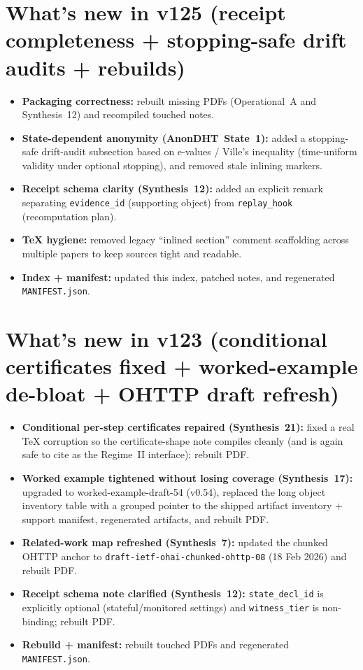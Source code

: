 \documentclass[11pt]{article}
\begin{document}
\section{What's new in v125 (receipt completeness + stopping-safe drift audits + rebuilds)}
\begin{itemize}[leftmargin=*]
\item \textbf{Packaging correctness:} rebuilt missing PDFs (Operational~A and Synthesis~12) and recompiled touched notes.
\item \textbf{State-dependent anonymity (AnonDHT~State~1):} added a stopping-safe drift-audit subsection based on e-values / Ville's inequality (time-uniform validity under optional stopping), and removed stale inlining markers.
\item \textbf{Receipt schema clarity (Synthesis~12):} added an explicit remark separating \texttt{evidence\_id} (supporting object) from \texttt{replay\_hook} (recomputation plan).
\item \textbf{TeX hygiene:} removed legacy ``inlined section'' comment scaffolding across multiple papers to keep sources tight and readable.
\item \textbf{Index + manifest:} updated this index, patched notes, and regenerated \texttt{MANIFEST.json}.
\end{itemize}

\section{What's new in v123 (conditional certificates fixed + worked-example de-bloat + OHTTP draft refresh)}
\begin{itemize}[leftmargin=*]
\item \textbf{Conditional per-step certificates repaired (Synthesis~21):} fixed a real TeX corruption so the certificate-shape note compiles cleanly (and is again safe to cite as the Regime~II interface); rebuilt PDF.
\item \textbf{Worked example tightened without losing coverage (Synthesis~17):} upgraded to worked-example-draft-54 (v0.54), replaced the long object inventory table with a grouped pointer to the shipped artifact inventory + support manifest, regenerated artifacts, and rebuilt PDF.
\item \textbf{Related-work map refreshed (Synthesis~7):} updated the chunked OHTTP anchor to \texttt{draft-ietf-ohai-chunked-ohttp-08} (18 Feb 2026) and rebuilt PDF.
\item \textbf{Receipt schema note clarified (Synthesis~12):} \texttt{state\_decl\_id} is explicitly optional (stateful/monitored settings) and \texttt{witness\_tier} is non-binding; rebuilt PDF.
\item \textbf{Rebuild + manifest:} rebuilt touched PDFs and regenerated \texttt{MANIFEST.json}.
\end{itemize}
\end{document}
